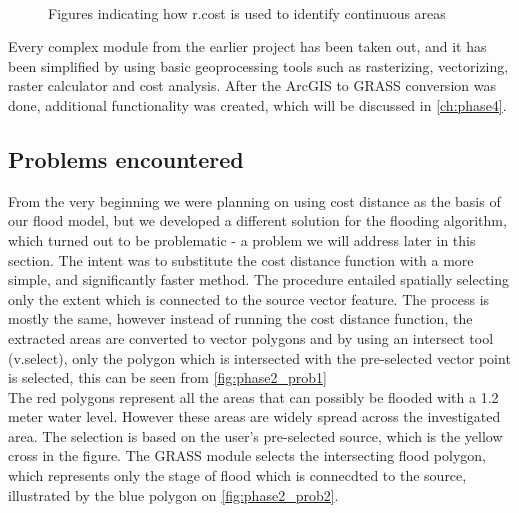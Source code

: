 \begin{figure}[h!]
  \myfloatalign
   \quad
   \\
 \caption{Figures indicating how r.cost is used to identify continuous areas}
 \label{fig:continuous}
\end{figure}

Every complex module from the earlier project has been taken out, and it has been simplified by using basic geoprocessing tools such as rasterizing, vectorizing, raster calculator and cost analysis. After the ArcGIS to GRASS conversion was done, additional functionality was created, which will be discussed in \autoref{ch:phase4}.

\subsection{Problems encountered}
\label{phase2problem}
From the very beginning we were planning on using cost distance as the basis of our flood model, but we developed a different solution for the flooding algorithm, which turned out to be problematic - a problem we will address later in this section. The intent was to substitute the cost distance function with a more simple, and significantly faster method. The procedure entailed spatially selecting only the extent which is connected to the source vector feature. The process is mostly the same, however instead of running the cost distance function, the extracted areas are converted to vector polygons and by using an intersect tool (v.select), only the polygon which is intersected with the pre-selected vector point is selected, this can be seen from \autoref{fig:phase2_prob1}\\
The red polygons represent all the areas that can possibly be flooded with a 1.2 meter water level. However these areas are widely spread across the investigated area. The selection is  based on the user's pre-selected source, which is the yellow cross in the figure. The GRASS module selects the intersecting flood polygon, which represents only the stage of flood which is connecdted to the source, illustrated by the blue polygon on \autoref{fig:phase2_prob2}. 


